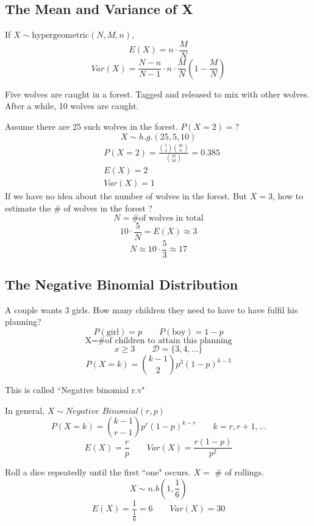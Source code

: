 \subsection{The Mean and Variance of X}
\begin{prop}
If $X \sim \text{hypergeometric}(N,M,n)$,
\[E(X)=n \cdot \frac{M}{N}\]
\[Var(X)=\frac{N-n}{N-1}\cdot n \cdot\frac{M}{N}\left(1-\frac{M}{N}\right)\]
\end{prop}

\begin{exmp}
Five wolves are caught in a forest. Tagged and released to mix with other wolves. After a while, 10 wolves are caught.

Assume there are 25 such wolves in the forest. $P(X=2)=?$
\[X \sim h.g.(25,5,10)\]
\begin{align*}
&P(X=2)=\frac{\binom 52 \binom {20}{8}}{\binom {25}{10}}=0.385 \\
&E(X)=2	\\
&Var(X)=1
\end{align*}
If we have no idea about the number of wolves in the forest. But $X=3$, how to estimate the \# of wolves in the forest ?
\[N= \text{\# of wolves in total}\]
\[10 \cdot \frac{5}{N}=E(X)\approx 3\]
\[N \approx 10 \cdot \frac{5}{3}\approx17\]
\end{exmp}

\subsection{The Negative Binomial Distribution}
\begin{exmp}
A couple wants 3 girls. How many children they need to have to have fulfil his planning?
\[P(\text{girl})=p \qquad P(\text{boy})=1-p\]
\[\text{X=\# of children to attain this planning}\]
\[x\geq 3 \qquad \mathcal{D}=\{3,4,\dots\}\]
\[P(X=k)=\binom {k-1}{2} p^3(1-p)^{k-3}\]

This is called ``Negative binomial r.v"
\end{exmp}

\begin{prop}
In general, $X \sim \textit{Negative Binomial}(r,p)$
\[P(X=k)=\binom {k-1}{r-1} p^r (1-p)^{k-r}  \qquad k=r,r+1,\dots	\]
\[E(X)=\frac{r}{p} \qquad  Var(X)=\frac{r(1-p)}{p^2} \]
\end{prop}

\begin{exmp}
Roll a dice repeatedly until the first ``one" occurs. $X =$ \# of rollings.
\[X \sim n.b(1,\frac{1}{6})\]
\[E(X)=\frac{1}{\frac{1}{6}}=6  	\qquad Var(X)=30\]
\end{exmp}

